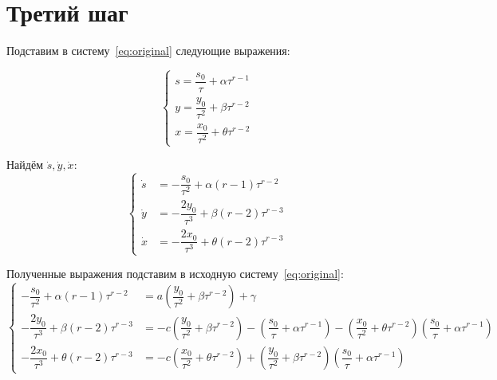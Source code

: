 \section{Третий шаг}

Подставим в систему~\ref{eq:original} следующие выражения:

\begin{equation*}
	\left\{
		\begin{aligned}
			s = \dfrac{s_0}{\tau} + \alpha \tau^{r-1} \\
			y = \dfrac{y_0}{\tau^2} + \beta \tau^{r-2} \\
			x = \dfrac{x_0}{\tau^2} + \theta \tau^{r-2} 
		\end{aligned}
	\right.
\end{equation*}

Найдём $ \dot s, \dot y, \dot x $:
\begin{equation*}
	\left\{
		\begin{aligned}
			\dot s &= -\dfrac{s_0}{\tau^{2}} + \alpha (r-1) \tau^{r-2} \\
			\dot y &= -\dfrac{2y_0}{\tau^{3}} + \beta (r-2) \tau^{r-3} \\
			\dot x &= -\dfrac{2x_0}{\tau^{3}} + \theta (r-2) \tau^{r-3}
		\end{aligned}
	\right.
\end{equation*}

Полученные выражения подставим в исходную систему~\ref{eq:original}:
\begin{equation}
  \label{eq:step3}
  \left\{
    \begin{aligned}
      -\dfrac{s_0}{\tau^{2}} + \alpha (r-1) \tau^{r-2} &= a \left( \dfrac{y_0}{\tau^2} + \beta \tau^{r-2} \right) + \gamma \\
      -\dfrac{2y_0}{\tau^{3}} + \beta (r-2) \tau^{r-3} &= -c \left( \dfrac{y_0}{\tau^2} + \beta \tau^{r-2} \right) - \left( \dfrac{s_0}{\tau} + \alpha \tau^{r-1} \right) - \left( \dfrac{x_0}{\tau^2} + \theta \tau^{r-2} \right) \left( \dfrac{s_0}{\tau} + \alpha \tau^{r-1} \right) \\
      -\dfrac{2x_0}{\tau^{3}} + \theta (r-2) \tau^{r-3} &= -c \left( \dfrac{x_0}{\tau^2} + \theta \tau^{r-2} \right) + \left( \dfrac{y_0}{\tau^2} + \beta \tau^{r-2} \right) \left( \dfrac{s_0}{\tau} + \alpha \tau^{r-1} \right)
    \end{aligned}
  \right.
\end{equation}


